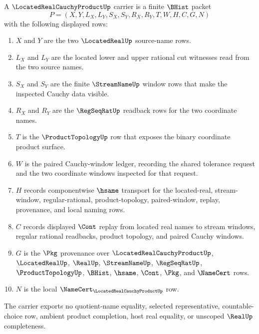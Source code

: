 \begin{definition}
\label{def:located-real-cauchy-product-carrier}
A $\LocatedRealCauchyProductUp$ carrier is a finite $\BHist$ packet
$$
P=(X,Y,L_X,L_Y,S_X,S_Y,R_X,R_Y,T,W,H,C,G,N)
$$
with the following displayed rows:
\begin{enumerate}
\item $X$ and $Y$ are the two $\LocatedRealUp$ source-name rows.
\item $L_X$ and $L_Y$ are the located lower and upper rational cut witnesses read from the two source names.
\item $S_X$ and $S_Y$ are the finite $\StreamNameUp$ window rows that make the inspected Cauchy data visible.
\item $R_X$ and $R_Y$ are the $\RegSeqRatUp$ readback rows for the two coordinate names.
\item $T$ is the $\ProductTopologyUp$ row that exposes the binary coordinate product surface.
\item $W$ is the paired Cauchy-window ledger, recording the shared tolerance request and the two coordinate windows inspected for that request.
\item $H$ records componentwise $\hsame$ transport for the located-real, stream-window, regular-rational, product-topology, paired-window, replay, provenance, and local naming rows.
\item $C$ records displayed $\Cont$ replay from located real names to stream windows, regular rational readbacks, product topology, and paired Cauchy windows.
\item $G$ is the $\Pkg$ provenance over $\LocatedRealCauchyProductUp$, $\LocatedRealUp$, $\RealUp$, $\StreamNameUp$, $\RegSeqRatUp$, $\ProductTopologyUp$, $\BHist$, $\hsame$, $\Cont$, $\Pkg$, and $\NameCert$ rows.
\item $N$ is the local $\NameCert_{\LocatedRealCauchyProductUp}$ row.
\end{enumerate}
The carrier exports no quotient-name equality, selected representative, countable-choice row, ambient product completion, host real equality, or unscoped $\RealUp$ completeness.
\end{definition}

